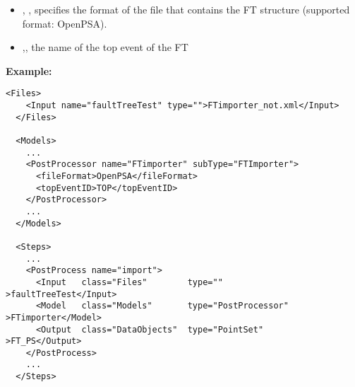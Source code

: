 %
%
\begin{itemize}
  \item {}, , specifies the format of the file that contains the
    FT structure (supported format: OpenPSA).
  \item  {},, the name of the top event of the FT
\end{itemize}

\textbf{Example:}

\begin{lstlisting}[style=XML,morekeywords={anAttribute},caption=FT Importer input example., label=lst:FT_PP_InputExample]
  <Files>
    <Input name="faultTreeTest" type="">FTimporter_not.xml</Input>
  </Files>
  
  <Models>
    ...
    <PostProcessor name="FTimporter" subType="FTImporter">
      <fileFormat>OpenPSA</fileFormat>
      <topEventID>TOP</topEventID>
    </PostProcessor> 
    ...  
  </Models>

  <Steps>
    ...
    <PostProcess name="import">
      <Input   class="Files"        type=""                >faultTreeTest</Input>
      <Model   class="Models"       type="PostProcessor"   >FTimporter</Model>
      <Output  class="DataObjects"  type="PointSet"        >FT_PS</Output>
    </PostProcess>
    ...
  </Steps>

\end{lstlisting}


